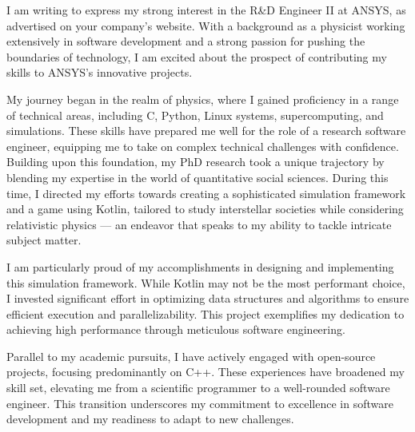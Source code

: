 \documentclass[11pt, a4paper]{awesome-cv}
\begin{document}
\makecvheader[R]

\makecvfooter
  {}%
  {}%
  {}

\makelettertitle

\begin{cvletter}


I am writing to express my strong interest in the R\&D Engineer II at ANSYS, as advertised on your company's website. With a background as a physicist working extensively in software development and a strong passion for pushing the boundaries of technology, I am excited about the prospect of contributing my skills to ANSYS's innovative projects.

My journey began in the realm of physics, where I gained proficiency in a range of technical areas, including C, Python, Linux systems, supercomputing, and simulations. These skills have prepared me well for the role of a research software engineer, equipping me to take on complex technical challenges with confidence. Building upon this foundation, my PhD research took a unique trajectory by blending my expertise in the world of quantitative social sciences. During this time, I directed my efforts towards creating a sophisticated simulation framework and a game using Kotlin, tailored to study interstellar societies while considering relativistic physics — an endeavor that speaks to my ability to tackle intricate subject matter.

I am particularly proud of my accomplishments in designing and implementing this simulation framework. While Kotlin may not be the most performant choice, I invested significant effort in optimizing data structures and algorithms to ensure efficient execution and parallelizability. This project exemplifies my dedication to achieving high performance through meticulous software engineering.

Parallel to my academic pursuits, I have actively engaged with open-source projects, focusing predominantly on C++. These experiences have broadened my skill set, elevating me from a scientific programmer to a well-rounded software engineer. This transition underscores my commitment to excellence in software development and my readiness to adapt to new challenges.


\end{cvletter}
\end{document}
